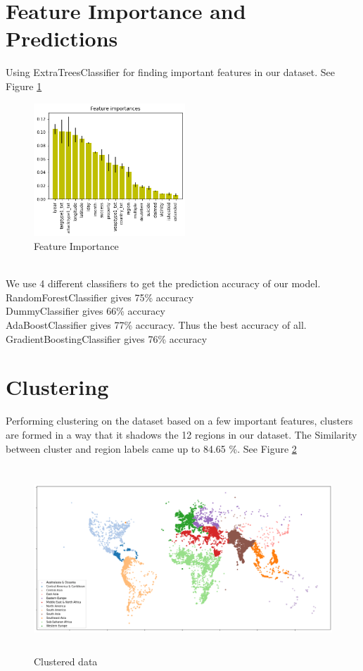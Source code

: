 \documentclass{article}
\begin{document}
\section{Feature Importance and Predictions}
Using ExtraTreesClassifier for finding important features in our dataset. See Figure \ref{fig:figure5}
\begin{figure} [h]
\begin{center}
\includegraphics[height=5cm]{img/importantfeatures.png} 
\caption{Feature Importance}
\label{fig:figure5}
\end{center}
\end{figure}
\\We use 4 different classifiers to get the prediction accuracy of our model.\\
RandomForestClassifier gives 75\% accuracy\\
DummyClassifier gives 66\% accuracy\\
AdaBoostClassifier gives 77\% accuracy. Thus the best accuracy of all.\\
GradientBoostingClassifier gives 76\% accuracy
\section{Clustering}
Performing clustering on the dataset based on a few important features, clusters are formed in a way that it shadows the 12 regions in our dataset. 
The Similarity between cluster and region labels came up to 84.65 \%. See Figure \ref{fig:figure6}
\begin{figure} [h]
\begin{center}
\includegraphics[height=7cm]{img/clustered.png} 
\caption{Clustered data}
\label{fig:figure6}
\end{center}
\end{figure}
\end{document}
